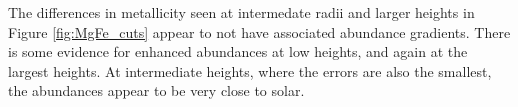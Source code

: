 The differences in metallicity seen at intermedate radii and larger
heights in Figure \ref{fig:MgFe_cuts} appear to not have associated
abundance gradients.  There is some evidence for enhanced abundances
at low heights, and again at the largest heights. At intermediate
heights, where the errors are also the smallest, the abundances appear
to be very close to solar.





